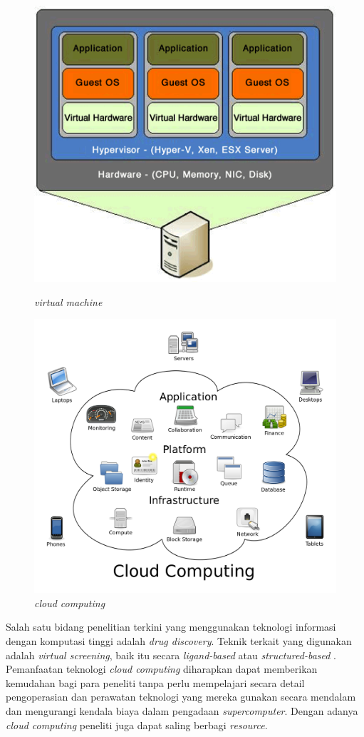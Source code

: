\begin{figure}
	\centering
	\includegraphics[scale = 0.5]{virtual_machine.png}
	\caption{\textit{virtual machine}}
	\includegraphics[scale = 0.1]{cloud_computing.png}
	\caption{\textit{cloud computing}}
\end{figure}
Salah satu bidang penelitian terkini yang menggunakan teknologi informasi dengan komputasi
tinggi adalah \textit{drug discovery}. Teknik terkait yang digunakan adalah 
\textit{virtual screening}, baik itu secara \textit{ligand-based} atau \textit{structured-based}
. Pemanfaatan teknologi \textit{cloud computing} diharapkan dapat memberikan kemudahan
bagi para peneliti tanpa perlu mempelajari secara detail pengoperasian dan perawatan teknologi yang mereka gunakan secara mendalam dan mengurangi kendala biaya dalam pengadaan \textit{supercomputer}. Dengan adanya \textit{cloud computing} peneliti juga dapat saling berbagi
\textit{resource}.

